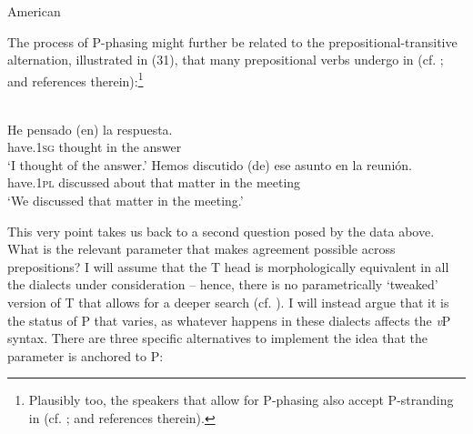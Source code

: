 \documentclass[output=paper]{langsci/langscibook}
\begin{document}
\ea%
    American \label{ex:gallego:31}\\
    \z
\z    

The process of P-phasing might further be related to the prepositional-tran\-si\-tive alternation, illustrated in (31), that many prepositional verbs undergo in  (cf. \citealt{Demonte1991,García-Miguel1995,Gallego2010}; and references therein):\footnote{Plausibly too, the speakers that allow for P-phasing also accept P-stranding in  (cf. \citealt{Depiante2013,Lemos2013}; and references therein).}

\ea%
    \label{ex:gallego:32}\\
    \ea
    \gll He             pensado (en) la     respuesta.        \\
         have{}.\textsc{1sg}  thought    in   the   answer\\
    \glt ‘I thought of the answer.’
    \ex
    \gll Hemos      discutido  (de)     ese  asunto  en  la   reunión.  \\
         have{}.\textsc{1pl}  discussed  about  that  matter  in  the meeting\\
    \glt ‘We discussed that matter in the meeting.’
    \z
\z

This very point takes us back to a second question posed by the data above. What is the relevant parameter that makes agreement possible across prepositions? I will assume that the T head is morphologically equivalent in all the  dialects under consideration – hence, there is no parametrically ‘tweaked’ version of T that allows for a deeper search (cf. \citealt{Chomsky2001Derivation}). I will instead argue that it is the status of P that varies, as whatever happens in these dialects affects the \textit{v}P syntax. There are three specific alternatives to implement the idea that the parameter is anchored to P:
\end{document}
